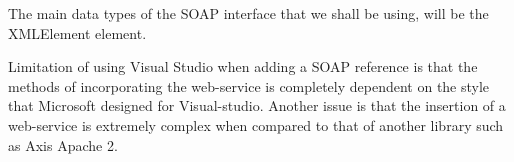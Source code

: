 The main data types of the SOAP interface that we shall be using, will be the XMLElement element.

Limitation of using Visual Studio when adding a SOAP reference is that the methods of incorporating the web-service is completely dependent on the style that Microsoft designed for Visual-studio. Another issue is that the insertion of a web-service is extremely complex when compared to that of another library such as Axis Apache 2. 

